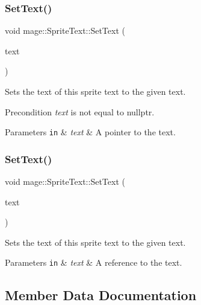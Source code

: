 \subsubsection{\texorpdfstring{Set\+Text()}{SetText()}\hspace{0.1cm}{\footnotesize\ttfamily [2/3]}}
{\footnotesize\ttfamily void mage\+::\+Sprite\+Text\+::\+Set\+Text (\begin{DoxyParamCaption}\item[{const wchar\+\_\+t $\ast$}]{text }\end{DoxyParamCaption})}

Sets the text of this sprite text to the given text.

\begin{DoxyPrecond}{Precondition}
{\itshape text} is not equal to {\ttfamily nullptr}. 
\end{DoxyPrecond}

\begin{DoxyParams}[1]{Parameters}
\mbox{\tt in}  & {\em text} & A pointer to the text. \\
\hline
\end{DoxyParams}
\hypertarget{classmage_1_1_sprite_text_a3ca23b77ab252f226d6525dfc2cb3d11}{}\label{classmage_1_1_sprite_text_a3ca23b77ab252f226d6525dfc2cb3d11} 
\subsubsection{\texorpdfstring{Set\+Text()}{SetText()}\hspace{0.1cm}{\footnotesize\ttfamily [3/3]}}
{\footnotesize\ttfamily void mage\+::\+Sprite\+Text\+::\+Set\+Text (\begin{DoxyParamCaption}\item[{const \hyperlink{classmage_1_1_color_string}{Color\+String} \&}]{text }\end{DoxyParamCaption})}

Sets the text of this sprite text to the given text.


\begin{DoxyParams}[1]{Parameters}
\mbox{\tt in}  & {\em text} & A reference to the text. \\
\hline
\end{DoxyParams}


\subsection{Member Data Documentation}
\hypertarget{classmage_1_1_sprite_text_a7d5f122cd5a87e47786796e41dbf6b71}{}\label{classmage_1_1_sprite_text_a7d5f122cd5a87e47786796e41dbf6b71} 

